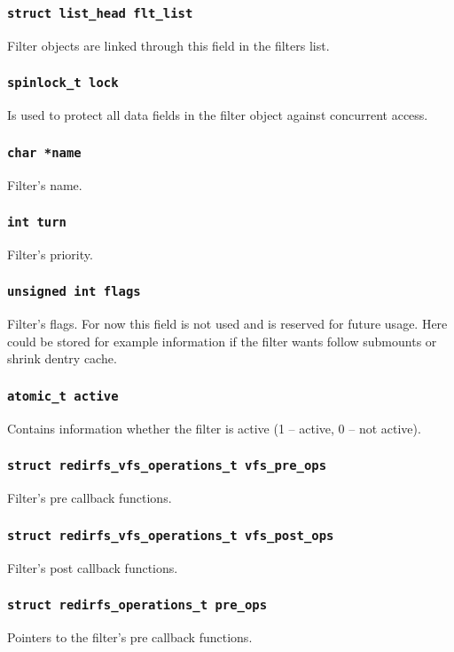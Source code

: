\subsubsection{\texttt{struct list\_head flt\_list}}
Filter objects are linked through this field in the filters list.

\subsubsection{\texttt{spinlock\_t lock}}
Is used to protect all data fields in the filter object against concurrent access.

\subsubsection{\texttt{char *name}}
Filter's name.

\subsubsection{\texttt{int turn}}
Filter's priority.

\subsubsection{\texttt{unsigned int flags}}
Filter's flags. For now this field is not used and is reserved for future usage.
Here could be stored for example information if the filter wants follow submounts or
shrink dentry cache.

\subsubsection{\texttt{atomic\_t active}}
Contains information whether the filter is active (1 -- active, 0 -- not active).

\subsubsection{\texttt{struct redirfs\_vfs\_operations\_t vfs\_pre\_ops}}
Filter's pre callback functions.

\subsubsection{\texttt{struct redirfs\_vfs\_operations\_t vfs\_post\_ops}}
Filter's post callback functions.

\subsubsection{\texttt{struct redirfs\_operations\_t pre\_ops}}
Pointers to the filter's pre callback functions.


